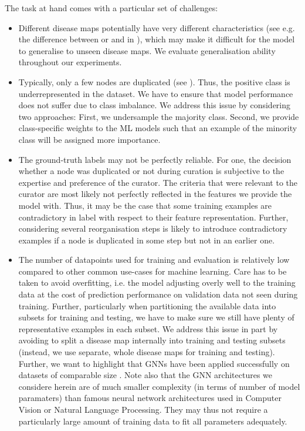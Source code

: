 \documentclass[
	fontsize=10pt, %
	twoside=false, %
	secnumdepth=1, %
  toc=indentunnumbered %
]{kaobook}
\begin{document}
The task at hand comes with a particular set of challenges:
\begin{itemize}
\item Different disease maps potentially have very different characteristics
  (see e.g. the difference between \ADMap or \PDMap and \ReconMap in
  ), which may make it difficult for the model to
  generalise to unseen disease maps. We evaluate generalisation ability
  throughout our experiments.
\item Typically, only a few nodes are duplicated (see ).
  Thus, the positive class is underrepresented in the dataset. We have to ensure that
  model performance does not suffer due to class imbalance. We address this
  issue by considering two approaches: First, we undersample the majority class.
  Second, we provide class-specific weights to the ML models such that an
  example of the minority class will be assigned more importance.
\item The ground-truth labels may not be perfectly reliable.
  For one, the decision whether a node was duplicated or not during curation is
  subjective to the expertise and preference of the curator. The criteria that
  were relevant to the curator are most likely not perfectly reflected in the
  features we provide the model with.
  Thus, it may be the case that some
  training examples are contradictory in label with respect to their feature
  representation. Further, considering several reorganisation steps is likely to
  introduce contradictory examples if a node is duplicated in some step but not
  in an earlier one.
\item The number of datapoints used for training and evaluation is relatively
  low compared to other common use-cases for machine learning. Care has to be
  taken to avoid overfitting, i.e. the model adjusting overly well to the training
  data at the cost of prediction performance on validation data not seen during
  training. Further, particularly when partitioning the available data into
  subsets for training and testing, we have to make sure we still have plenty of
  representative examples in each subset. We address this issue in part by avoiding to
  split a disease map internally into training and testing subsets (instead, we
  use separate, whole disease maps for training and testing). Further, we
  want to highlight that GNNs have been applied successfully on datasets
  of comparable size \cite{schulte-sasse_IntegrationMultiomicsData_2021}.
  Note also that the GNN architectures we considere herein are of
  much smaller complexity (in terms of number of model paramaters) than famous
  neural network architectures used in Computer Vision or Natural Language
  Processing. They may thus not require a particularly large amount of training
  data to fit all parameters adequately.
\end{itemize}
\end{document}
